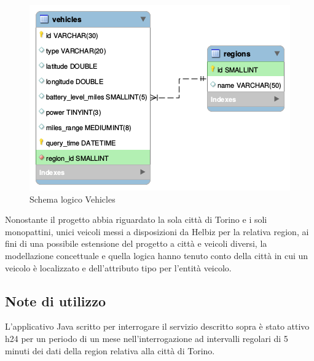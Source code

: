 \begin{figure}[H]                                                                                                                                                            
\centering                                                                                                                                                                   
\includegraphics[width=\textwidth]{diagrams/vehicles_logic}                                                                                                                                   
\caption{Schema logico Vehicles}                                                                                                                                            
\label{fig:vehicles_logic_physic}                                                                                                                                                           
\end{figure}

Nonostante il progetto abbia riguardato la sola città di Torino e i soli monopattini, unici
veicoli messi a disposizioni da Helbiz per la relativa region, ai fini di una possibile
estensione del progetto a città e veicoli diversi, la modellazione concettuale
e quella logica hanno tenuto conto della città in cui un veicolo è localizzato e dell'attributo
tipo per l'entità veicolo. 

\subsection{Note di utilizzo}

L'applicativo Java scritto per interrogare il servizio descritto sopra è stato attivo h24
per un periodo di un mese nell'interrogazione ad intervalli regolari di 5 minuti dei dati
della region relativa alla città di Torino.

